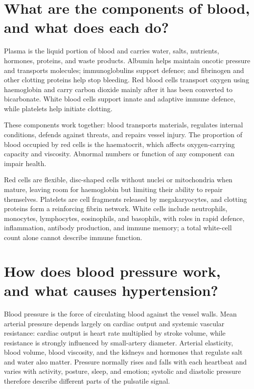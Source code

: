 \documentclass[11pt,oneside]{report}
\begin{document}
\section{What are the components of blood, and what does each do?}

Plasma is the liquid portion of blood and carries water, salts, nutrients,
hormones, proteins, and waste products. Albumin helps maintain oncotic pressure
and transports molecules; immunoglobulins support defence; and fibrinogen and
other clotting proteins help stop bleeding. Red blood cells transport oxygen
using haemoglobin and carry carbon dioxide mainly after it has been converted
to bicarbonate. White blood cells support innate and adaptive immune defence,
while platelets help initiate clotting.

These components work together: blood transports materials, regulates internal
conditions, defends against threats, and repairs vessel injury. The proportion
of blood occupied by red cells is the haematocrit, which affects oxygen-carrying
capacity and viscosity. Abnormal numbers or function of any component can
impair health.

Red cells are flexible, disc-shaped cells without nuclei or mitochondria when
mature, leaving room for haemoglobin but limiting their ability to repair
themselves. Platelets are cell fragments released by megakaryocytes, and
clotting proteins form a reinforcing fibrin network. White cells include
neutrophils, monocytes, lymphocytes, eosinophils, and basophils, with roles in
rapid defence, inflammation, antibody production, and immune memory; a total
white-cell count alone cannot describe immune function.

\section{How does blood pressure work, and what causes hypertension?}

Blood pressure is the force of circulating blood against the vessel walls. Mean
arterial pressure depends largely on cardiac output and systemic vascular
resistance: cardiac output is heart rate multiplied by stroke volume, while
resistance is strongly influenced by small-artery diameter. Arterial elasticity,
blood volume, blood viscosity, and the kidneys and hormones that regulate salt
and water also matter. Pressure normally rises and falls with each heartbeat
and varies with activity, posture, sleep, and emotion; systolic and diastolic
pressure therefore describe different parts of the pulsatile signal.
\end{document}
